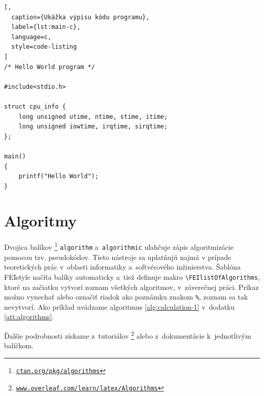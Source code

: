 \begin{lstlisting}[,
  caption={Ukážka výpisu kódu programu},
  label={lst:main-c},
  language=c,
  style=code-listing
]
/* Hello World program */

#include<stdio.h>

struct cpu_info {
    long unsigned utime, ntime, stime, itime;
    long unsigned iowtime, irqtime, sirqtime;
};

main()
{
    printf("Hello World");
}
\end{lstlisting}

\section*{Algoritmy}
Dvojica balíkov%
\footnote{\href{https://ctan.org/pkg/algorithms}{\texttt{ctan.org/pkg/algorithms}}}
\verb|algorithm|
a~\verb|algorithmic| uľahčuje zápis algoritmizácie pomocou tzv. pseudokódov.
Tieto nástroje sa uplatňujú najmä v prípade teoretických prác v~oblasti informatiky a~softvérového inžinierstva.
Šablóna FEIstyle načíta balíky automaticky a~tiež definuje makro \verb|\FEIlistOfAlgorithms|, ktoré na začiatku vytvorí zoznam všetkých algoritmov, v~záverečnej práci.
Príkaz možno vynechať alebo označiť riadok ako poznámku znakom \verb|%|, zoznam sa tak nevytvorí. Ako príklad uvádzame algoritmus \ref{alg:calculation-1} v~dodatku \ref{att:algorithms}.

Ďalšie podrobnosti získame z~tutoriálov%
\footnote{\href{https://www.overleaf.com/learn/latex/Algorithms}{\texttt{www.overleaf.com/learn/latex/Algorithms}}}
alebo z~dokumentácie k~jednotlivým balíčkom.
